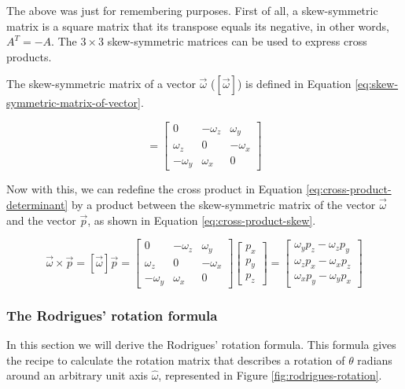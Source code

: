 \documentclass[12pt]{article}
\begin{document}
The above was just for remembering purposes. First of all, a skew-symmetric matrix is a square matrix that its transpose equals its negative, in other words, $A^T = -A$. The $3 \times 3$ skew-symmetric matrices can be used to express cross products.

The skew-symmetric matrix of a vector $\vec{\omega}$ ($[\vec{\omega}]$) is defined in Equation \ref{eq:skew-symmetric-matrix-of-vector}.

\begin{equation}
    [\vec{\omega}] = \begin{bmatrix}
                        0 & -\omega_z & \omega_y \\
                        \omega_z & 0 & -\omega_x \\
                        -\omega_y & \omega_x & 0
                     \end{bmatrix}
    \label{eq:skew-symmetric-matrix-of-vector}
\end{equation}

Now with this, we can redefine the cross product in Equation \ref{eq:cross-product-determinant} by a product between the skew-symmetric matrix of the vector $\vec{\omega}$ and the vector $\vec{p}$, as shown in Equation \ref{eq:cross-product-skew}.

\begin{equation}
    \vec{\omega} \times \vec{p} = \left[\vec{\omega}\right] \vec{p} = 
        \begin{bmatrix}
            0 & -\omega_z & \omega_y \\
            \omega_z & 0 & -\omega_x \\
            -\omega_y & \omega_x & 0
        \end{bmatrix}
        \begin{bmatrix}
            p_x \\ p_y \\ p_z
        \end{bmatrix} =
        \begin{bmatrix}
            \omega_y p_z - \omega_z p_y \\
            \omega_z p_x - \omega_x p_z \\
            \omega_x p_y - \omega_y p_x
        \end{bmatrix}
    \label{eq:cross-product-skew}
\end{equation}

\subsubsection{The Rodrigues' rotation formula}
In this section we will derive the Rodrigues' rotation formula. This formula gives the recipe to calculate the rotation matrix that describes a rotation of $\theta$ radians around an arbitrary unit axis $\hat{\omega}$, represented in Figure \ref{fig:rodrigues-rotation}.
\end{document}
